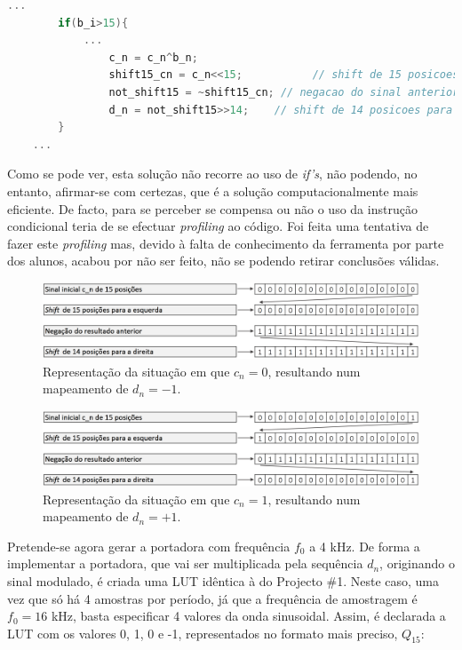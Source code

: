 \documentclass[11pt]{article}
\numberwithin{equation}{section}
\begin{document}
\begin{lstlisting}[language=C]
	...
		if(b_i>15){
			...
				c_n = c_n^b_n;
				shift15_cn = c_n<<15;	   		// shift de 15 posicoes para a esquerda
				not_shift15 = ~shift15_cn; // negacao do sinal anterior 
				d_n = not_shift15>>14;    // shift de 14 posicoes para a direita
		}
	...
\end{lstlisting}

Como se pode ver, esta solução não recorre ao uso de \textit{if's}, não podendo, no entanto, afirmar-se com certezas, que é a solução computacionalmente mais eficiente. De facto, para se perceber se compensa ou não o uso da instrução condicional teria de se efectuar \textit{profiling} ao código. Foi feita uma tentativa de fazer este \textit{profiling} mas, devido à falta de conhecimento da ferramenta por parte dos alunos, acabou por não ser feito, não se podendo retirar conclusões válidas.

\begin{figure}[H]
	\centering
	\includegraphics[keepaspectratio=true, scale=0.30]{teoricas/esquema2}
	\caption{Representação da situação em que $c_{n} = 0$, resultando num mapeamento de $d_{n} = -1$.}
	\vspace{-0.8em}
\end{figure}

\begin{figure}[H]
	\centering
	\includegraphics[keepaspectratio=true, scale=0.30]{teoricas/esquema1}
	\caption{Representação da situação em que $c_{n} = 1$, resultando num mapeamento de $d_{n} = +1$.}
	\vspace{-0.8em}
\end{figure}

Pretende-se agora gerar a portadora com frequência $f_0$  a 4 kHz. De forma a implementar a portadora, que vai ser multiplicada pela sequência $d_n$, originando o sinal modulado, é criada uma LUT idêntica à do Projecto \#1. Neste caso, uma vez que só há 4 amostras por período, já que a frequência de amostragem é 
$f_0 = 16$ kHz, basta especificar 4 valores da onda sinusoidal. Assim, é declarada a LUT com os valores 0, 1, 0 e -1, representados no formato mais preciso, $Q_{15}$:
\end{document}
